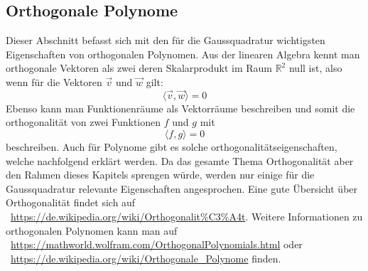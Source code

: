 \subsection{Orthogonale Polynome
\label{quadratur:subsection:orthogonalepolynome}}
Dieser Abschnitt befasst sich mit den für die Gaussquadratur wichtigsten 
Eigenschaften von orthogonalen Polynomen. 
Aus der linearen Algebra kennt man orthogonale Vektoren als
zwei deren Skalarprodukt im Raum $\mathbb{R}^{2}$ null ist,
also wenn für die Vektoren $\vec{v}$ und $\vec{w}$ gilt:
\begin{equation}
    \langle \vec{v}, \vec{w} \rangle = 0
\end{equation}
Ebenso kann man Funktionenräume als Vektorräume beschreiben und somit
die orthogonalität von zwei Funktionen $f$ und $g$ mit
\begin{equation}
    \langle f, g \rangle = 0
\end{equation}
beschreiben.
Auch für Polynome gibt es solche orthogonalitätseigenschaften, 
welche nachfolgend erklärt werden. 
Da das gesamte Thema Orthogonalität aber den Rahmen dieses Kapitels 
sprengen würde, 
werden nur einige für die Gaussquadratur relevante Eigenschaften
angesprochen. 
Eine gute Übersicht über Orthogonalität findet sich auf ~\url{https://de.wikipedia.org/wiki/Orthogonalit%C3%A4t}.
Weitere Informationen zu orthogonalen Polynomen kann man auf 
~\url{https://mathworld.wolfram.com/OrthogonalPolynomials.html} 
oder 
~\url{https://de.wikipedia.org/wiki/Orthogonale_Polynome} finden.

